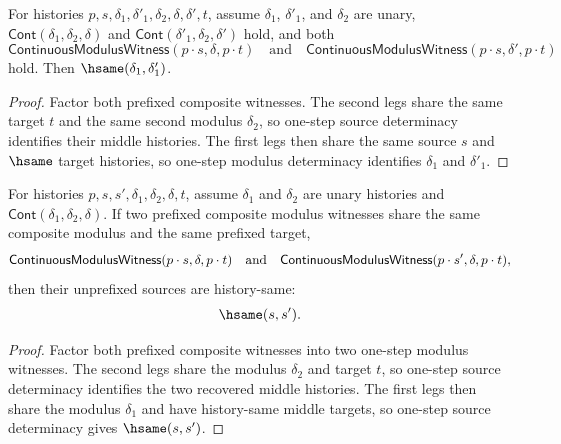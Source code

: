\begin{theorem}
\label{thm:continuous-modulus-witness-prefixed-composite-first-deterministic}
For histories $p,s,\delta_1,\delta'_1,\delta_2,\delta,\delta',t$, assume
$\delta_1$, $\delta'_1$, and $\delta_2$ are unary,
$\mathsf{Cont}(\delta_1,\delta_2,\delta)$ and
$\mathsf{Cont}(\delta'_1,\delta_2,\delta')$ hold, and both
$$
\mathsf{ContinuousModulusWitness}(p\cdot s,\delta,p\cdot t)
\quad\text{and}\quad
\mathsf{ContinuousModulusWitness}(p\cdot s,\delta',p\cdot t)
$$
hold. Then $\hsame(\delta_1,\delta'_1)$.
\end{theorem}
\begin{proof}
Factor both prefixed composite witnesses. The second legs share the same target
$t$ and the same second modulus $\delta_2$, so one-step source determinacy
identifies their middle histories. The first legs then share the same source
$s$ and $\hsame$ target histories, so one-step modulus determinacy identifies
$\delta_1$ and $\delta'_1$.
\end{proof}

\begin{theorem}
\label{thm:continuous-modulus-witness-prefixed-composite-source-deterministic}
For histories $p,s,s',\delta_1,\delta_2,\delta,t$, assume $\delta_1$ and
$\delta_2$ are unary histories and $\mathsf{Cont}(\delta_1,\delta_2,\delta)$.
If two prefixed composite modulus witnesses share the same composite modulus and
the same prefixed target,
$$
\mathsf{ContinuousModulusWitness}(p\cdot s,\delta,p\cdot t)
\quad\hbox{and}\quad
\mathsf{ContinuousModulusWitness}(p\cdot s',\delta,p\cdot t),
$$
then their unprefixed sources are history-same:
$$
\hsame(s,s').
$$
\end{theorem}
\begin{proof}
Factor both prefixed composite witnesses into two one-step modulus witnesses.
The second legs share the modulus $\delta_2$ and target $t$, so one-step source
determinacy identifies the two recovered middle histories. The first legs then
share the modulus $\delta_1$ and have history-same middle targets, so one-step
source determinacy gives $\hsame(s,s')$.
\end{proof}

